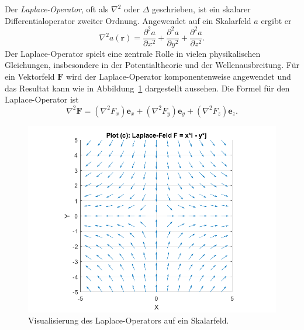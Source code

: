 Der \emph{Laplace-Operator}, oft als $\nabla^2$ oder $\Delta$ geschrieben,
%
%
%
ist ein skalarer Differentialoperator zweiter Ordnung.
Angewendet auf ein Skalarfeld $a$ ergibt er
\begin{equation}
\nabla^2 a(\boldsymbol{r}) = \frac{\partial^2 a}{\partial x^2} + \frac{\partial^2 a}{\partial y^2} + \frac{\partial^2 a}{\partial z^2}.
\end{equation}
Der Laplace-Operator spielt eine zentrale Rolle in vielen physikalischen Gleichungen, insbesondere in der Potentialtheorie und der Wellenausbreitung.
%
%
Für ein Vektorfeld $\boldsymbol{F}$ wird der Laplace-Operator
komponentenweise angewendet und das Resultat kann wie in
Abbildung~\ref{fig:LaplaceAlg} dargestellt aussehen.
Die Formel für den Laplace-Operator ist
\begin{equation}
\nabla^2 \boldsymbol{F} = (\nabla^2 F_x)\boldsymbol{e}_x + (\nabla^2 F_y)\boldsymbol{e}_y + (\nabla^2 F_z)\boldsymbol{e}_z.
\end{equation}

\begin{figure}
    \centering
    \includegraphics[scale=0.4]{papers/helmholtz/images/Laplace_Feld.png}
    \caption{Visualisierung des Laplace-Operators auf ein Skalarfeld.}
    \label{fig:LaplaceAlg}
\end{figure}


